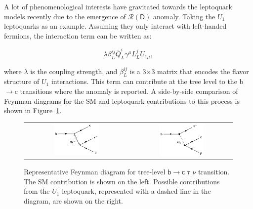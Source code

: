 A lot of phenomenological interests have gravitated towards the leptoquark models recently due to the emergence of $\mathcal{R}(\textsf{D})$ anomaly. Taking the $U_{1}$ leptoquarks as an example. Assuming they only interact with left-handed fermions, the interaction term can be written as:

\begin{equation}
\lambda\beta^{ij}_{L}\bar{Q}_{L}^{i}\gamma^{\mu}L_{L}^{j}U_{1\mu},
\end{equation}

where $\lambda$ is the coupling strength, and $\beta^{ij}_{L}$ is a 3$\times$3 matrix that encodes the flavor structure of $U_{1}$ interactions. This term can contribute at the tree level to the b$\rightarrow$c transitions where the anomaly is reported. A side-by-side comparison of Feynman diagrams for the \ac{SM} and leptoquark contributions to this process is shown in Figure~\ref{fig:Leptoquark}.

\begin{figure}[tbh!]
 \begin{center}
 \begin{tabular}{cc}
 \includegraphics[width=0.45\textwidth]{figures/Part1/BSM/SMbtoc}&
 \includegraphics[width=0.45\textwidth]{figures/Part1/BSM/U1}\\
 \end{tabular}
 \caption{Representative Feynman diagram for tree-level $\textsf{b}\rightarrow\textsf{c}\uptau\nu$ transition. The \ac{SM} contribution is shown on the left. Possible contributions from the $U_{1}$ leptoquark, represented with a dashed line in the diagram, are shown on the right.}
 \label{fig:Leptoquark}
 \end{center}
\end{figure}

